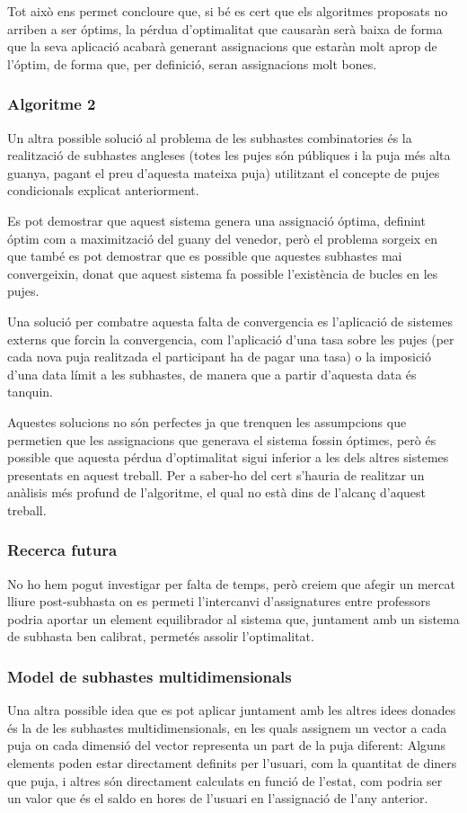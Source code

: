 \documentclass[10pt,twocolumn]{article}
\begin{document}
Tot això ens permet concloure que, si bé es cert que els algoritmes proposats no arriben a ser óptims, la pérdua d'optimalitat que causaràn serà baixa de forma que la seva aplicació acabarà generant assignacions que estaràn molt aprop de l'óptim, de forma que, per definició, seran assignacions molt bones.

\subsubsection{Algoritme 2}
Un altra possible solució al problema de les subhastes combinatories és la realització de subhastes angleses (totes les pujes són públiques i la puja més alta guanya, pagant el preu d'aquesta mateixa puja) utilitzant el concepte de pujes condicionals explicat anteriorment.

Es pot demostrar que aquest sistema genera una assignació óptima, definint óptim com a maximització del guany del venedor, però el problema sorgeix en que també es pot demostrar que es possible que aquestes subhastes mai convergeixin, donat que aquest sistema fa possible l'existència de bucles en les pujes.

Una solució per combatre aquesta falta de convergencia es l'aplicació de sistemes externs que forcin la convergencia, com l'aplicació d'una tasa sobre les pujes (per cada nova puja realitzada el participant ha de pagar una tasa) o la imposició d'una data límit a les subhastes, de manera que a partir d'aquesta data és tanquin.

Aquestes solucions no són perfectes ja que trenquen les assumpcions que permetien que les assignacions que generava el sistema fossin óptimes, però és possible que aquesta pérdua d'optimalitat sigui inferior a les dels altres sistemes presentats en aquest treball. Per a saber-ho del cert s'hauria de realitzar un anàlisis més profund de l'algoritme, el qual no està dins de l'alcanç d'aquest treball.

\subsubsection{Recerca futura}
No ho hem pogut investigar per falta de temps, però creiem que afegir un mercat lliure post-subhasta on es permeti l'intercanvi d'assignatures entre professors podria aportar un element equilibrador al sistema que, juntament amb un sistema de subhasta ben calibrat, permetés assolir l'optimalitat.

\subsubsection{Model de subhastes multidimensionals}
Una altra possible idea que es pot aplicar juntament amb les altres idees donades és la de les subhastes multidimensionals, en les quals assignem un vector a cada puja on cada dimensió del vector representa un part de la puja diferent: Alguns elements poden estar directament definits per l'usuari, com la quantitat de diners que puja, i altres són directament calculats en funció de l'estat, com podria ser un valor que és el saldo en hores de l'usuari en l'assignació de l'any anterior.
\end{document}

